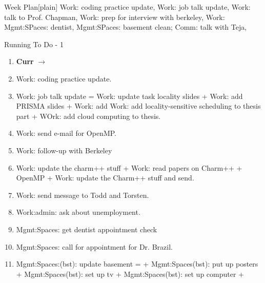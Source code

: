 
\begin{frame}{Week Plan}[plain]
Work: coding practice update, Work: job talk update, Work: talk to
Prof. Chapman, Work: prep for interview with berkeley, Work: 
Mgmt:SPaces: dentist, Mgmt:SPaces: basement clean; Comm: talk with
Teja, 

\end{frame} 
\begin{frame}{Running To Do - 1}
\begin{enumerate}

  \tiny \item[] \tiny \textbf{Curr} $\rightarrow$
  
\item \tiny Work: coding practice update. 
\item \tiny Work: job talk update = Work: update task locality slides
  + Work: add PRISMA slides + Work: add Work: add locality-sensitive 
scheduling to thesis part + WOrk: add cloud computing to thesis. 

\item \tiny Work: send e-mail for OpenMP. 

\item \tiny Work: follow-up with Berkeley 
  
\item \tiny Work: update the charm++ stuff +  Work: read papers on 
  Charm++ + OpenMP + Work: update the Charm++ stuff and send. 

\item \tiny Work: send message to Todd and Torsten. 
\item \tiny Work:admin: ask about unemployment. 
\item \tiny Mgmt:Spaces: get dentist appointment check 
\item \tiny Mgmt:Spaces: call for appointment for Dr. Brazil. 
\item \tiny Mgmt:Spaces:(bst): update basement =
   + Mgmt:Spaces(bst): put up posters + Mgmt:Spaces(bst): set up tv
  + Mgmt:Spaces(bst): set up computer  +  
  
    \seti
\end{enumerate}
 
\end{frame}
  
